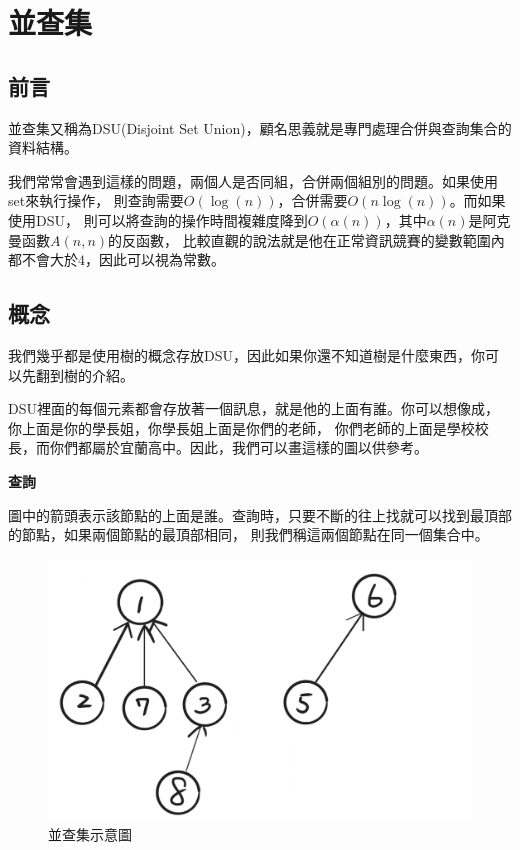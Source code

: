 \section{並查集}
    \subsection{前言}
    並查集又稱為DSU(Disjoint Set Union)，顧名思義就是專門處理合併與查詢集合的資料結構。
    
    我們常常會遇到這樣的問題，兩個人是否同組，合併兩個組別的問題。如果使用set來執行操作，
    則查詢需要$O(\log{(n)})$，合併需要$O(n\log{(n)})$。而如果使用DSU，
    則可以將查詢的操作時間複雜度降到$O(\alpha(n))$，其中$\alpha(n)$是阿克曼函數$A(n,n)$的反函數，
    比較直觀的說法就是他在正常資訊競賽的變數範圍內都不會大於$4$，因此可以視為常數。

    \subsection{概念}
    我們幾乎都是使用樹的概念存放DSU，因此如果你還不知道樹是什麼東西，你可以先翻到樹的介紹。

    DSU裡面的每個元素都會存放著一個訊息，就是他的上面有誰。你可以想像成，你上面是你的學長姐，你學長姐上面是你們的老師，
    你們老師的上面是學校校長，而你們都屬於宜蘭高中。因此，我們可以畫這樣的圖以供參考。

    \textbf{查詢}

    圖中的箭頭表示該節點的上面是誰。查詢時，只要不斷的往上找就可以找到最頂部的節點，如果兩個節點的最頂部相同，
    則我們稱這兩個節點在同一個集合中。

    \begin{figure}[ht]
        \centering
        \includegraphics[width=\textwidth]{../Images/DSU.png}
        \caption{並查集示意圖}
    \end{figure}

